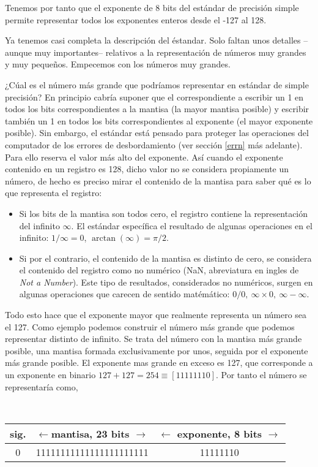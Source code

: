 \begin{paracol}{2}
Tenemos por tanto que el exponente de 8 bits del estándar de precisión simple permite representar todos los exponentes enteros desde el -127 al 128.

Ya tenemos casi completa la descripción del éstandar. Solo faltan unos detalles --aunque muy importantes-- relativos a la representación de números muy grandes y muy pequeños. Empecemos con los números muy grandes.

¿Cúal es el número más grande que podríamos representar en estándar de simple precisión? En principio cabría suponer que el correspondiente a escribir un 1 en todos los bits correspondientes a la mantisa (la mayor mantisa posible) y escribir también un 1 en todos los bits correspondientes al exponente (el mayor exponente posible). Sin embargo, el estándar está pensado para proteger las operaciones del computador de los errores de desbordamiento (ver sección \ref{errn} más adelante). Para ello reserva el valor más alto del exponente. Así cuando el exponente contenido en un registro es 128, dicho valor no se considera propiamente un número, de hecho es preciso mirar el contenido de la mantisa para saber qué es lo que representa el registro: 

\begin{itemize}
\item Si los bits de la mantisa son todos cero, el registro contiene la representación del infinito $\infty$.  El estándar específica el resultado de algunas operaciones en el infinito: $1/\infty=0$, $\arctan(\infty)=\pi/2$. 

\item {}  Si por el contrario, el contenido de la mantisa es distinto de cero, se considera el contenido del registro como no numérico (NaN, abreviatura en ingles de \emph{Not a Number}). Este tipo de resultados, considerados no numéricos, surgen en algunas operaciones que carecen de sentido matémático: $0/0, \ \infty\times0,\ \infty -\infty$. \end{itemize}

Todo esto hace que el exponente mayor que realmente representa un número sea el 127.  Como ejemplo podemos construir el número más grande que podemos representar distinto de infinito. Se trata del número con la mantisa más grande posible, una mantisa formada exclusivamente por unos, seguida por el exponente más grande posible. El exponente mas grande en exceso es 127, que corresponde a un exponente en binario $127+127=254 \equiv [11111110]$. Por tanto el número se representaría como,
\end{paracol}
\ \\
\begin{tabular}{|c||c||c|}
\hline
sig.&$\leftarrow$mantisa, 23 bits $\rightarrow$&$\leftarrow$ exponente, 8 bits $\rightarrow$\\
\hline
0&11111111111111111111111&11111110\\
\hline
\end{tabular}\\

